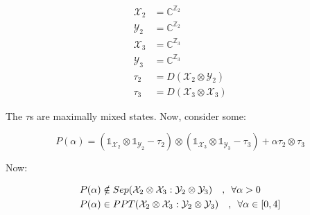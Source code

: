 \documentclass{article}
\begin{document}
\begin{align*}
    \mathcal{X}_2 &= \mathbb{C}^{\mathbb{Z}_2} \\
    \mathcal{Y}_2 &= \mathbb{C}^{\mathbb{Z}_2} \\
    \mathcal{X}_3 &= \mathbb{C}^{\mathbb{Z}_3} \\
    \mathcal{Y}_3 &= \mathbb{C}^{\mathbb{Z}_3} \\
    \tau_2 &= D(\mathcal{X}_2 \otimes \mathcal{Y}_2) \\
    \tau_3 &= D(\mathcal{X}_3 \otimes \mathcal{X}_3)
\end{align*}

The $\tau$s are maximally mixed states. Now, consider some:

\[ 
    P(\alpha) = \left( \mathds{1}_{\mathcal{X}_2} \otimes
    \mathds{1}_{\mathcal{Y}_2} - \tau_2 \right) \otimes \left(
\mathds{1}_{\mathcal{X}_3} \otimes \mathds{1}_{\mathcal{Y}_3} - \tau_3 \right) +
\alpha \tau_2 \otimes \tau_3
\]

Now:

\begin{align*}
    P(\alpha) & \notin Sep(\mathcal{X}_2 \otimes \mathcal{X}_3: \mathcal{Y}_2
    \otimes \mathcal{Y}_3) \quad,\enskip \forall \alpha > 0 \\
    P(\alpha) & \in PPT(\mathcal{X}_2 \otimes \mathcal{X}_3: \mathcal{Y}_2
    \otimes \mathcal{Y}_3) \quad,\enskip \forall \alpha \in [0,4]
\end{align*}
\end{document}
